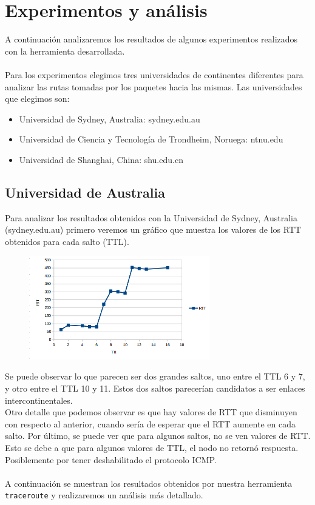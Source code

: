 \section{Experimentos y análisis}

A continuación analizaremos los resultados de algunos experimentos realizados con la herramienta desarrollada.
\\\\
Para los experimentos elegimos tres universidades de continentes diferentes para analizar las rutas tomadas por los paquetes hacia las mismas. Las universidades que elegimos son:
\begin{itemize}
\item Universidad de Sydney, Australia: sydney.edu.au
\item Universidad de Ciencia y Tecnología de Trondheim, Noruega: ntnu.edu
\item Universidad de Shanghai, China: shu.edu.cn
\end{itemize}
\subsection{Universidad de Australia}
Para analizar los resultados obtenidos con la Universidad de Sydney, Australia (sydney.edu.au) primero veremos un gráfico que muestra los valores de los RTT obtenidos para cada salto (TTL).

\FloatBarrier

\begin{figure}[ht!]
  \centering
   \includegraphics[width=0.7\textwidth]{imagenes/AUS.png}
\end{figure}

\FloatBarrier

Se puede observar lo que parecen ser dos grandes saltos, uno entre el TTL 6 y 7, y otro entre el TTL 10 y 11. Estos dos saltos parecerían candidatos a ser enlaces intercontinentales. 
\\
Otro detalle que podemos observar es que hay valores de RTT que disminuyen con respecto al anterior, cuando sería de esperar que el RTT aumente en cada salto.
Por último, se puede ver que para algunos saltos, no se ven valores de RTT. Esto se debe a que para algunos valores de TTL, el nodo no retornó respuesta. Posiblemente por tener deshabilitado el protocolo ICMP.
\\\\
A continuación se muestran los resultados obtenidos por nuestra herramienta \texttt{traceroute} y realizaremos un análisis más detallado.     

